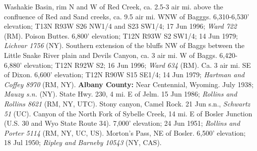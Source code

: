 Washakie Basin, rim N and W of Red Creek, ca. 2.5-3 air mi. above the confluence of Red and Sand creeks, ca. 9.5 air mi. WNW of Bagggs. 6,310-6,530’ elevation; T13N R93W S26 NW1/4 and S23 SW1/4; 17 Jun 1996; \textit{Ward 722} (RM).  Poison Buttes. 6,800’ elevation; T12N R93W S2 SW1/4; 14 Jun 1979; \textit{Lichvar 1756} (NY).  Southern extension of the bluffs NW of Baggs between the Little Snake River plain and Devils Canyon, ca. 3 air mi. W of Baggs. 6,420-6,880’ elevation; T12N R92W S2; 16 Jun 1996; \textit{Ward 634} (RM).  Ca. 3 air mi. SE of Dixon. 6,600’ elevation; T12N R90W S15 SE1/4; 14 Jun 1979; \textit{Hartman and Coffey 8970} (RM, NY).  \textbf{Albany County:} Near Centennial, Wyoming. July 1938; \textit{Mauzy s.n.} (NY).  State Hwy. 230, 4 mi. E of Jelm. 15 Jun 1986; \textit{Rollins and Rollins 8621} (RM, NY, UTC).  Stony canyon, Camel Rock. 21 Jun s.n., \textit{Schwartz 51} (UC).  Canyon of the North Fork of Sybelle Creek, 14 mi. E of Bosler Junction (U.S. 30 and Wyo State Route 34). 7,000’ elevation; 24 Jun 1951; \textit{Rollins and Porter 5114} (RM, NY, UC, US).  Morton’s Pass, NE of Bosler. 6,500’ elevation; 18 Jul 1950; \textit{Ripley and Barneby 10543} (NY, CAS).  




  







